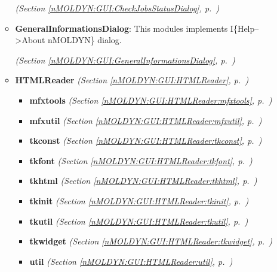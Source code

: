 \begin{itemize}
\begin{itemize}
  \textit{(Section \ref{nMOLDYN:GUI:CheckJobsStatusDialog}, p.~\pageref{nMOLDYN:GUI:CheckJobsStatusDialog})}

    \item \textbf{GeneralInformationsDialog}: This modules implements I\{Help--{\textgreater}About nMOLDYN\} dialog.



  \textit{(Section \ref{nMOLDYN:GUI:GeneralInformationsDialog}, p.~\pageref{nMOLDYN:GUI:GeneralInformationsDialog})}

    \item \textbf{HTMLReader}
  \textit{(Section \ref{nMOLDYN:GUI:HTMLReader}, p.~\pageref{nMOLDYN:GUI:HTMLReader})}

      \begin{itemize}
    \setlength{\parskip}{0ex}
        \item \textbf{mfxtools}
  \textit{(Section \ref{nMOLDYN:GUI:HTMLReader:mfxtools}, p.~\pageref{nMOLDYN:GUI:HTMLReader:mfxtools})}

        \item \textbf{mfxutil}
  \textit{(Section \ref{nMOLDYN:GUI:HTMLReader:mfxutil}, p.~\pageref{nMOLDYN:GUI:HTMLReader:mfxutil})}

        \item \textbf{tkconst}
  \textit{(Section \ref{nMOLDYN:GUI:HTMLReader:tkconst}, p.~\pageref{nMOLDYN:GUI:HTMLReader:tkconst})}

        \item \textbf{tkfont}
  \textit{(Section \ref{nMOLDYN:GUI:HTMLReader:tkfont}, p.~\pageref{nMOLDYN:GUI:HTMLReader:tkfont})}

        \item \textbf{tkhtml}
  \textit{(Section \ref{nMOLDYN:GUI:HTMLReader:tkhtml}, p.~\pageref{nMOLDYN:GUI:HTMLReader:tkhtml})}

        \item \textbf{tkinit}
  \textit{(Section \ref{nMOLDYN:GUI:HTMLReader:tkinit}, p.~\pageref{nMOLDYN:GUI:HTMLReader:tkinit})}

        \item \textbf{tkutil}
  \textit{(Section \ref{nMOLDYN:GUI:HTMLReader:tkutil}, p.~\pageref{nMOLDYN:GUI:HTMLReader:tkutil})}

        \item \textbf{tkwidget}
  \textit{(Section \ref{nMOLDYN:GUI:HTMLReader:tkwidget}, p.~\pageref{nMOLDYN:GUI:HTMLReader:tkwidget})}

        \item \textbf{util}
  \textit{(Section \ref{nMOLDYN:GUI:HTMLReader:util}, p.~\pageref{nMOLDYN:GUI:HTMLReader:util})}


\end{itemize}
\end{itemize}
\end{itemize}
